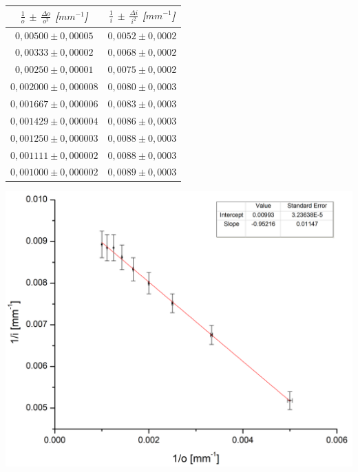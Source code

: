 \documentclass[a4paper,12pt]{article}
\newenvironment{Figure}
  {\par\medskip\noindent\minipage{\linewidth}}
  {\endminipage\par\medskip}
\begin{document}
\begin{multicols*}{2}
\begin{Figure}
            \begin{tabular}{cc}
                \toprule
                \textit{\textbf{$\frac{1}{o}$ $\pm$ $\frac{\Delta o}{o^2}$ [$mm^{-1}$]}} & \textit{\textbf{$\frac{1}{i}$ $\pm$ $\frac{\Delta i}{i^2}$ [$mm^{-1}$]}}\\
                \midrule
                $0,00500 \pm 0,00005$ & $0,0052 \pm 0,0002$ \\ 
                $0,00333 \pm 0,00002$ & $0,0068 \pm 0,0002$ \\ 
                $0,00250 \pm 0,00001$ & $0,0075 \pm 0,0002$ \\ 
                $0,002000 \pm 0,000008$ & $0,0080 \pm 0,0003$ \\ 
                $0,001667 \pm 0,000006$ & $0,0083 \pm 0,0003$ \\ 
                $0,001429 \pm 0,000004$ & $0,0086 \pm 0,0003$ \\ 
                $0,001250 \pm 0,000003$ & $0,0088 \pm 0,0003$ \\ 
                $0,001111 \pm 0,000002$ & $0,0088 \pm 0,0003$ \\ 
                $0,001000 \pm 0,000002$ & $0,0089 \pm 0,0003$ \\
                \bottomrule
            \end{tabular}

            \label{1/i vs 1/o lc}
        \end{Figure}

        \begin{Figure}
            \centering
            \includegraphics[width=1\linewidth]{GraficaLC.png}
            \label{grafica lc}
        \end{Figure}


\end{multicols*}
\end{document}
